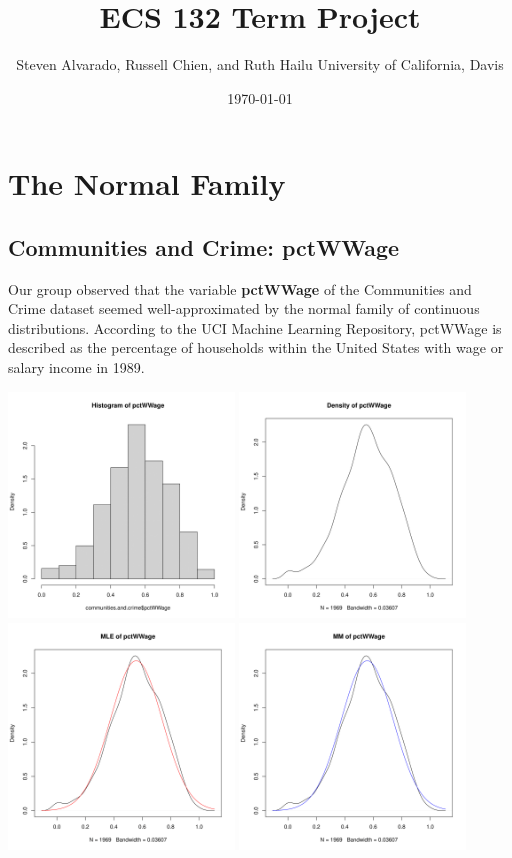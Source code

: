 \documentclass[12pt, letterpaper]{report}
\title{\textbf{ECS 132 Term Project}}
\author{\parbox{\linewidth}{\centering%
  Steven Alvarado, Russell Chien, and Ruth Hailu\endgraf\bigskip
  University of California, Davis}}
\date{\monthyeardate\today}
\begin{document}
\maketitle
\chapter{The Normal Family}
\section{Communities and Crime: pctWWage}

Our group observed that the variable \textbf{pctWWage} of the Communities and Crime dataset seemed well-approximated by the normal family of continuous distributions.
According to the UCI Machine Learning Repository, pctWWage is described as the percentage of households within the United States with wage or salary income in 1989.

\centering
\includegraphics[width=0.45\textwidth]{normal/pctWWage_hist}
\includegraphics[width=0.45\textwidth]{normal/pctWWage_density}
\includegraphics[width=0.45\textwidth]{normal/pctWWage_mle}
\includegraphics[width=0.45\textwidth]{normal/pctWWage_mm}
\end{document}
